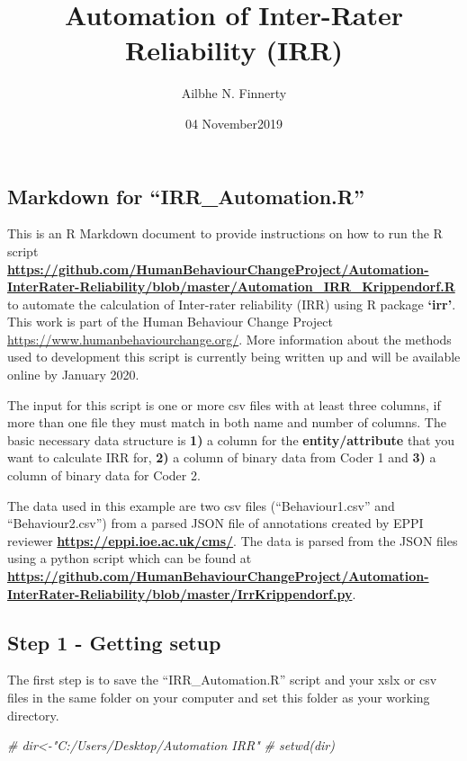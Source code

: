 \documentclass[]{article}
\title{Automation of Inter-Rater Reliability (IRR)}
\author{Ailbhe N. Finnerty}
\date{04 November2019}
\newenvironment{Shaded}{\begin{snugshade}}{\end{snugshade}}
\newcommand{\CommentTok}[1]{\textcolor[rgb]{0.56,0.35,0.01}{\textit{#1}}}
\begin{document}
\maketitle

\subsection{\texorpdfstring{Markdown for
``IRR\_Automation.R''}{Markdown for IRR\_Automation.R}}\label{markdown-for-irr_automation.r}

This is an R Markdown document to provide instructions on how to run the
R script
\textbf{\url{https://github.com/HumanBehaviourChangeProject/Automation-InterRater-Reliability/blob/master/Automation_IRR_Krippendorf.R}}
to automate the calculation of Inter-rater reliability (IRR) using R
package \textbf{`irr'}. This work is part of the Human Behaviour Change
Project \url{https://www.humanbehaviourchange.org/}. More information
about the methods used to development this script is currently being
written up and will be available online by January 2020.

The input for this script is one or more csv files with at least three
columns, if more than one file they must match in both name and number
of columns. The basic necessary data structure is \textbf{1)} a column
for the \textbf{entity/attribute} that you want to calculate IRR for,
\textbf{2)} a column of binary data from Coder 1 and \textbf{3)} a
column of binary data for Coder 2.

The data used in this example are two csv files (``Behaviour1.csv'' and
``Behaviour2.csv'') from a parsed JSON file of annotations created by
EPPI reviewer \textbf{\url{https://eppi.ioe.ac.uk/cms/}}. The data is
parsed from the JSON files using a python script which can be found at
\textbf{\url{https://github.com/HumanBehaviourChangeProject/Automation-InterRater-Reliability/blob/master/IrrKrippendorf.py}}.

\subsection{Step 1 - Getting setup}\label{step-1---getting-setup}

The first step is to save the ``IRR\_Automation.R'' script and your xslx
or csv files in the same folder on your computer and set this folder as
your working directory.

\begin{Shaded}
\begin{Highlighting}[]
\CommentTok{# dir<-"C:/Users/Desktop/Automation IRR"}
\CommentTok{# setwd(dir)}
\end{Highlighting}
\end{Shaded}
\end{document}
